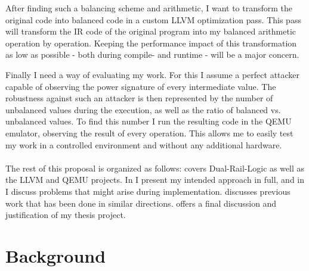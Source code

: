\documentclass{article}
\newcommand{\qemu}{QEMU}
\newcommand{\dual}{Dual-Rail-Logic}
\newcommand{\llvm}{LLVM}
\newcommand{\exposee}{proposal}
\begin{document}
After finding such a balancing scheme and arithmetic, I want to transform the original code into balanced code in a custom \llvm{} optimization pass.
This pass will transform the IR code of the original program into my balanced arithmetic operation by operation.
Keeping the performance impact of this transformation as low as possible - both during compile- and runtime - will be a major concern.

Finally I need a way of evaluating my work.
For this I assume a perfect attacker capable of observing the power signature of every intermediate value.
The robustness against such an attacker is then represented by the number of unbalanced values during the execution, as well as the ratio of balanced vs. unbalanced values.
To find this number I run the resulting code in the \qemu{} emulator, observing the result of every operation.
This allows me to easily test my work in a controlled environment and without any additional hardware.
\\
\\
The rest of this \exposee{} is organized as follows:
 covers \dual{} as well as the \llvm{} and \qemu{} projects.
In  I present my intended approach in full, and in  I discuss problems that might arise during implementation.
 discusses previous work that has been done in similar directions.
 offers a final discussion and justification of my thesis project.

\section{Background}
\label{sec:background}
\end{document}

